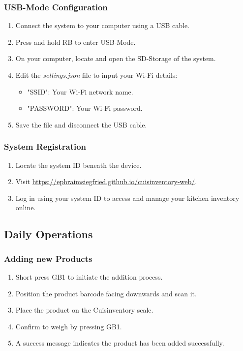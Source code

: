 \documentclass{article}
\begin{document}
\subsubsection{USB-Mode Configuration}
\begin{enumerate}
	\item Connect the system to your computer using a USB cable.
	\item Press and hold RB to enter USB-Mode.
	\item On your computer, locate and open the SD-Storage of the system.
	\item Edit the \textit{settings.json} file to input your Wi-Fi details:
	      \begin{itemize}
		      \item "SSID": Your Wi-Fi network name.
		      \item "PASSWORD": Your Wi-Fi password.
	      \end{itemize}
	\item Save the file and disconnect the USB cable.
\end{enumerate}

\subsubsection{System Registration}
\begin{enumerate}
	\item Locate the system ID beneath the device.
	\item Visit \url{https://ephraimsiegfried.github.io/cuisinventory-web/}.
	\item Log in using your system ID to access and manage your kitchen inventory online.
\end{enumerate}

\subsection{Daily Operations}
\subsubsection{Adding new Products}
\begin{enumerate}
	\item Short press GB1 to initiate the addition process.
	\item Position the product barcode facing downwards and scan it.
	\item Place the product on the Cuisinventory scale.
	\item Confirm to weigh by pressing GB1.
	\item A success message indicates the product has been added successfully.
\end{enumerate}
\end{document}

